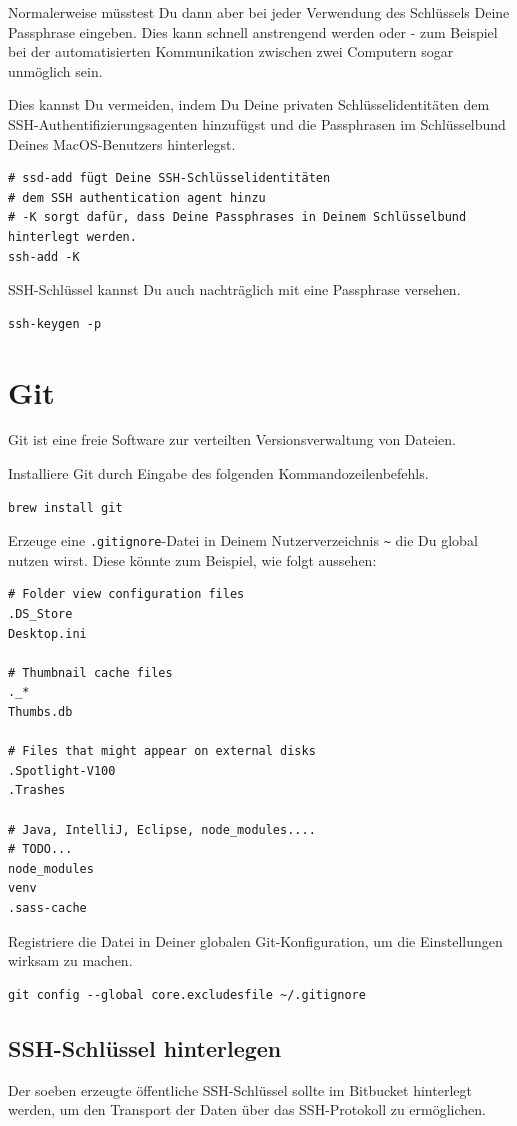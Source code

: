 \documentclass[]{article}
\newcommand{\code}[1]{\texttt{#1}}
\begin{document}
Normalerweise müsstest Du dann aber bei jeder Verwendung des Schlüssels Deine Passphrase eingeben. Dies kann schnell anstrengend werden oder - zum Beispiel bei der automatisierten Kommunikation zwischen zwei Computern sogar unmöglich sein.

Dies kannst Du vermeiden, indem Du Deine privaten Schlüsselidentitäten dem SSH-Authentifizierungsagenten hinzufügst und die Passphrasen im Schlüsselbund Deines MacOS-Benutzers hinterlegst. 

\begin{verbatim}
# ssd-add fügt Deine SSH-Schlüsselidentitäten
# dem SSH authentication agent hinzu
# -K sorgt dafür, dass Deine Passphrases in Deinem Schlüsselbund hinterlegt werden.
ssh-add -K
\end{verbatim}

SSH-Schlüssel kannst Du auch nachträglich mit eine Passphrase versehen.
\begin{verbatim}
ssh-keygen -p
\end{verbatim}

\section{Git}
Git ist eine freie Software zur verteilten Versionsverwaltung von Dateien.

Installiere Git durch Eingabe des folgenden Kommandozeilenbefehls.
\begin{verbatim}
brew install git
\end{verbatim}

Erzeuge eine \code{.gitignore}-Datei in Deinem Nutzerverzeichnis \code{\~} die Du global nutzen wirst. Diese könnte zum Beispiel, wie folgt aussehen:
\begin{verbatim}
# Folder view configuration files
.DS_Store
Desktop.ini

# Thumbnail cache files
._*
Thumbs.db

# Files that might appear on external disks
.Spotlight-V100
.Trashes

# Java, IntelliJ, Eclipse, node_modules....
# TODO...
node_modules
venv
.sass-cache
\end{verbatim}

Registriere die Datei in Deiner globalen Git-Konfiguration, um die Einstellungen wirksam zu machen.
\begin{verbatim}
git config --global core.excludesfile ~/.gitignore
\end{verbatim}

\subsection{SSH-Schlüssel hinterlegen}
Der soeben erzeugte öffentliche SSH-Schlüssel sollte im Bitbucket hinterlegt werden, um den Transport der Daten über das SSH-Protokoll zu ermöglichen.
\end{document}
